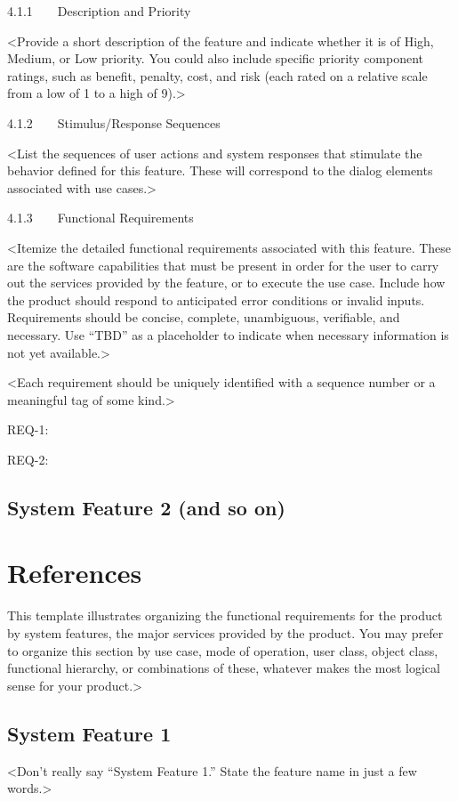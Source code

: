 \documentclass{scrreprt}
\begin{document}
4.1.1    Description and Priority

<Provide a short description of the feature and indicate whether it is of High, Medium, or Low priority. You could also include specific priority component ratings, such as benefit, penalty, cost, and risk (each rated on a relative scale from a low of 1 to a high of 9).>

4.1.2    Stimulus/Response Sequences

<List the sequences of user actions and system responses that stimulate the behavior defined for this feature. These will correspond to the dialog elements associated with use cases.>

4.1.3    Functional Requirements

<Itemize the detailed functional requirements associated with this feature. These are the software capabilities that must be present in order for the user to carry out the services provided by the feature, or to execute the use case. Include how the product should respond to anticipated error conditions or invalid inputs. Requirements should be concise, complete, unambiguous, verifiable, and necessary. Use “TBD” as a placeholder to indicate when necessary information is not yet available.>

<Each requirement should be uniquely identified with a sequence number or a meaningful tag of some kind.>

REQ-1:

REQ-2:

\subsection*{System Feature 2 (and so on)}
    \section{References} 
    This template illustrates organizing the functional requirements for the product by system features, the major services provided by the product. You may prefer to organize this section by use case, mode of operation, user class, object class, functional hierarchy, or combinations of these, whatever makes the most logical sense for your product.>

\subsection*{System Feature 1}

<Don’t really say “System Feature 1.” State the feature name in just a few words.>
\end{document}
